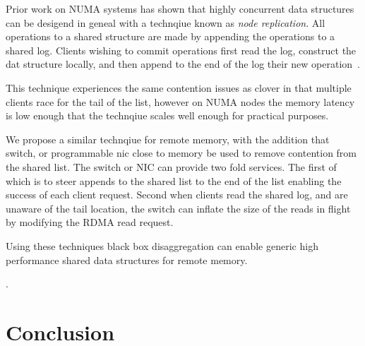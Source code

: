 Prior work on NUMA systems has shown that highly concurrent
data structures can be desigend in geneal with a technqiue
known as \textit{node replication}. All operations to a
shared structure are made by appending the operations to a
shared log. Clients wishing to commit operations first read
the log, construct the dat structure locally, and then
append to the end of the log their new operation~\cite{bbd}.

This technique experiences the same contention issues as
clover in that multiple clients race for the tail of the
list, however on NUMA nodes the memory latency is low enough
that the technqiue scales well enough for practical
purposes. 

We propose a similar technqiue for remote memory, with the
addition that switch, or programmable nic close to memory be
used to remove contention from the shared list. The switch
or NIC can provide two fold services. The first of which is
to steer appends to the shared list to the end of the list
enabling the success of each client request. Second when
clients read the shared log, and are unaware of the tail
location, the switch can inflate the size of the reads in
flight by modifying the RDMA read request. 

Using these techniques black box disaggregation can enable
generic high performance shared data structures for remote
memory.

.

\section{Conclusion}
